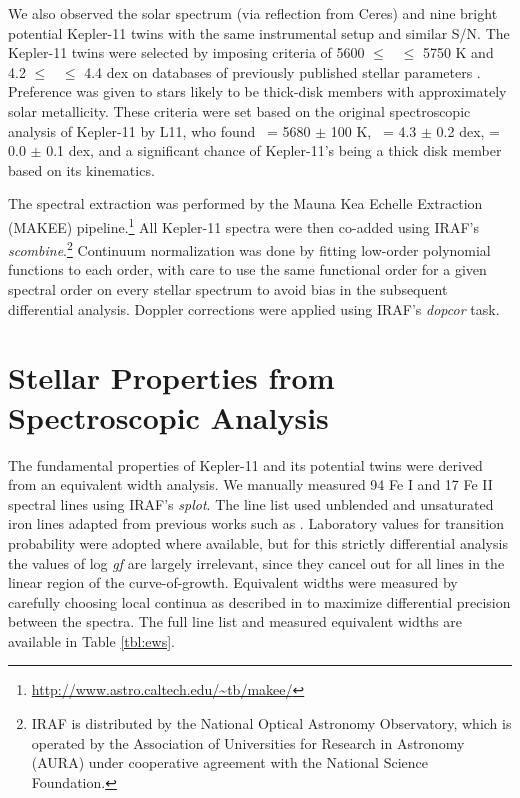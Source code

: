 \documentclass[oneside]{emulateapj}
\begin{document}
We also observed the solar spectrum (via reflection from Ceres) and nine bright potential Kepler-11 twins with the same instrumental setup and similar S/N. The Kepler-11 twins were selected by imposing criteria of 5600 $\leq$ \teff\ $\leq$ 5750 K and 4.2 $\leq$ \logg\ $\leq$ 4.4 dex on databases of previously published stellar parameters \citep{Adibekyan2012, Bensby2014}. Preference was given to stars likely to be thick-disk members with approximately solar metallicity. These criteria were set based on the original spectroscopic analysis of Kepler-11 by L11, who found \teff\ = 5680 $\pm$ 100 K, \logg\ = 4.3 $\pm$ 0.2 dex, \feh = 0.0 $\pm$ 0.1 dex, and a significant chance of Kepler-11's being a thick disk member based on its kinematics.

The spectral extraction was performed by the Mauna Kea Echelle Extraction (MAKEE) pipeline.\footnote{\url{
http://www.astro.caltech.edu/~tb/makee/}} All Kepler-11 spectra were then co-added using IRAF's \textit{scombine}.\footnote{IRAF is distributed by the National Optical Astronomy Observatory, which is operated by the Association of Universities for Research in Astronomy (AURA) under cooperative agreement with the National Science Foundation.} Continuum normalization was done by fitting low-order polynomial functions to each order, with care to use the same functional order for a given spectral order on every stellar spectrum to avoid bias in the subsequent differential analysis. Doppler corrections were applied using IRAF's \textit{dopcor} task.

\section{Stellar Properties from Spectroscopic Analysis}
\label{s:characterization}

The fundamental properties of Kepler-11 and its potential twins were derived from an equivalent width analysis. We manually measured 94 Fe I and 17 Fe II spectral lines using IRAF's \textit{splot}. The line list used unblended and unsaturated iron lines adapted from previous works such as \citet{Ramirez2014}. Laboratory values for transition probability were adopted where available, but for this strictly differential analysis the values of log \textit{gf} are largely irrelevant, since they cancel out for all lines in the linear region of the curve-of-growth. Equivalent widths were measured by carefully choosing local continua as described in \citet{Bedell2014} to maximize differential precision between the spectra. The full line list and measured equivalent widths are available in Table \ref{tbl:ews}.
\end{document}
